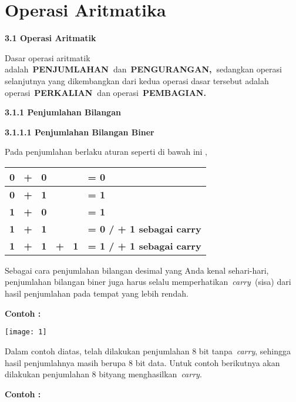 \documentclass[11pt,fleqn]{book} %
\begin{document}
\noindent 

\noindent

\section{Operasi Aritmatika}

\noindent \textbf{3.1 Operasi Aritmatik}

Dasar operasi aritmatik adalah~\textbf{PENJUMLAHAN~}dan~\textbf{PENGURANGAN,~}sedangkan operasi selanjutnya yang dikembangkan dari kedua operasi dasar tersebut adalah operasi~\textbf{PERKALIAN~}dan operasi~\textbf{PEMBAGIAN.}

\noindent \textbf{3.1.1 Penjumlahan Bilangan}

\noindent \textbf{3.1.1.1 Penjumlahan Bilangan Biner}

Pada penjumlahan berlaku aturan seperti di bawah ini ,

\begin{center}
\begin{tabular}{|p{0.9in}|p{1.3in}|} \hline 
\textbf{0~ +~ 0} & \textbf{= 0} \\ \hline 
\textbf{0~ +~ 1} & \textbf{= 1} \\ \hline 
\textbf{1~ +~ 0} & \textbf{= 1} \\ \hline 
\textbf{1~ +~ 1} & \textbf{= 0 / + 1 sebagai carry} \\ \hline 
\textbf{1~ +~ 1~ +~ 1} & \textbf{= 1 / + 1 sebagai carry} \\ \hline 
\end{tabular}
\end{center}

Sebagai cara penjumlahan bilangan desimal yang Anda kenal sehari-hari, penjumlahan bilangan biner juga harus selalu memperhatikan~\textit{carry~}(sisa) dari hasil penjumlahan pada tempat yang lebih rendah.

\noindent \textbf{Contoh :}

\begin{center}
\noindent \texttt{[image: 1]}
\end{center}
\noindent 

\noindent Dalam contoh diatas, telah dilakukan penjumlahan 8 bit tanpa~\textit{carry}, sehingga hasil penjumlahnya masih berupa 8 bit data. Untuk contoh berikutnya akan dilakukan penjumlahan 8 bityang menghasilkan~\textit{carry}.

\noindent \textbf{Contoh :}
\end{document}
